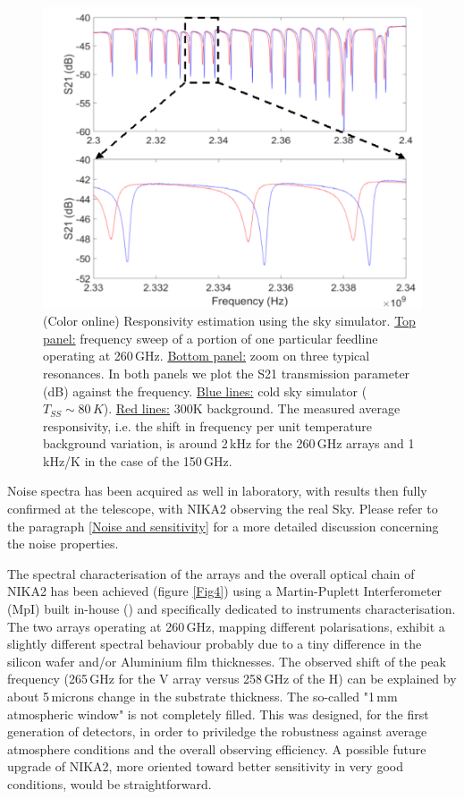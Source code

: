 \documentclass[]{aa} %
\begin{document}
\begin{figure}[h]
\begin{center}
   \centering
    \includegraphics[width=1.0\linewidth]{260GHz-H_sky.png}
    \caption{(Color online) Responsivity estimation using the sky simulator. \underline{Top panel:} frequency sweep of a portion of one particular feedline operating at 260\,GHz. \underline{Bottom panel:} zoom on three typical resonances. In both panels we plot the S21 transmission parameter (dB) against the frequency. \underline{Blue lines:} cold sky simulator ($T_{SS} \sim 80\,K$). \underline{Red lines:} 300K background. The measured average responsivity, i.e. the shift in frequency per unit temperature background variation, is around 2\,kHz for the 260\,GHz arrays and 1\,kHz/K in the case of the 150\,GHz.}
         \label{Shift_f}
\end{center}
\end{figure}

Noise spectra has been acquired as well in laboratory, with results then fully confirmed at the telescope, with NIKA2 observing the real Sky. Please refer to the paragraph \ref{Noise and sensitivity} for a more detailed discussion concerning the noise properties. 

The spectral characterisation of the arrays and the overall optical chain of NIKA2 has been achieved (figure \ref{Fig4}) using a Martin-Puplett Interferometer (MpI) built in-house (\cite{Durand2008}) and specifically dedicated to instruments characterisation. The two arrays operating at 260\,GHz, mapping different polarisations, exhibit a slightly different spectral behaviour probably due to a tiny difference in the silicon wafer and/or Aluminium film thicknesses. The observed shift of the peak frequency (265\,GHz for the V array versus 258\,GHz of the H) can be explained by about 5\,microns change in the substrate thickness. The so-called "1\,mm atmospheric window" is not completely filled. This was designed, for the first generation of detectors, in order to priviledge the robustness against average atmosphere conditions and the overall observing efficiency. A possible future upgrade of NIKA2, more oriented toward better sensitivity in very good conditions, would be straightforward. 
\end{document}

